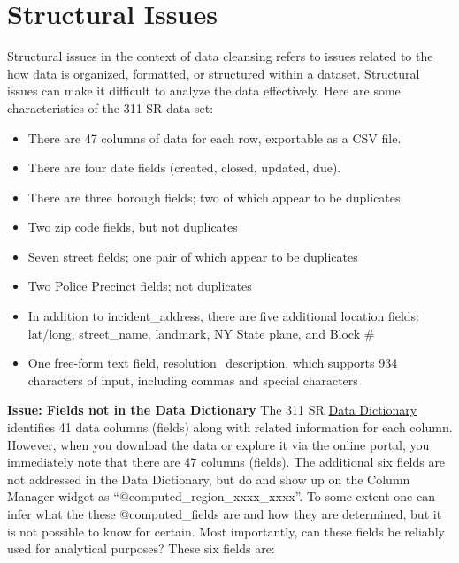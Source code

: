 \documentclass[12pt, titlepage]{article}
\begin{document}
\section{Structural Issues}
\label{sec:structural}
Structural issues in the context of data cleansing refers to issues 
related to the how data is organized, formatted, or structured within a 
dataset. Structural issues can make it difficult to analyze the 
data effectively. Here are some characteristics of the 311 SR data set:

\begin{itemize}
	\item There are 47 columns of data for each row, exportable as a CSV file.
	\item There are four date fields (created, closed, updated, due).
	\item There are three borough fields; two of which appear to be duplicates.
	\item Two zip code fields, but not duplicates
	\item Seven street fields; one pair of which appear to be duplicates
	\item Two Police Precinct fields; not duplicates
	\item In addition to incident\_address, there are five additional location fields: 
	lat/long, street\_name, landmark, NY State plane, and Block \#
	\item One free-form text field, resolution\_description, which 
	supports 934 characters of input, including commas and special characters
\end{itemize}

\textbf{Issue: Fields not in the Data Dictionary} The 311 SR 
\href{https://data.cityofnewyork.us/api/views/erm2-nwe9/files/b372b884-f86a-453b-ba16-1fe06ce9d212?download=true&filename=311_ServiceRequest_2010-Present_DataDictionary_Updated_2023.xlsx}{Data Dictionary}
 identifies 41 data columns (fields) along with related information 
 for each column. However, when you download the data or 
 explore it via the online portal, you immediately note that there 
 are 47 columns (fields). The additional six fields are not addressed in the 
 Data Dictionary, but do and show up on the Column Manager widget
 as ``@computed\_region\_xxxx\_xxxx''. To some extent one can infer 
 what the these @computed\_fields are and how they are determined, but 
 it is not possible to know for certain. Most importantly, can these fields 
 be reliably used for analytical purposes?  These six fields are:
\end{document}
